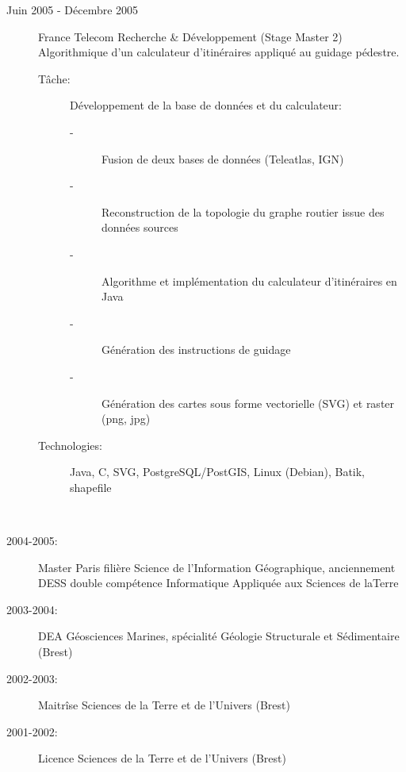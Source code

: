 \documentclass[11pt, oneside, a4paper, french]{article}
\begin{document}
\begin{description}
\item[Juin 2005 - D\'ecembre 2005] France Telecom Recherche \& D\'eveloppement (Stage Master 2)\\
 Algorithmique d'un calculateur d'itin\'eraires  appliqu\'e au guidage p\'edestre.
 \begin{description}
 \item[T\^ache:] D\'eveloppement de la base de donn\'ees et du calculateur:
   \begin{description}
   \item[-] Fusion de deux bases de donn\'ees (Teleatlas, IGN)
   \item[-] Reconstruction de la topologie du graphe routier issue des donn\'ees sources 
   \item[-] Algorithme et impl\'ementation du calculateur d'itin\'eraires en Java
   \item[-] G\'en\'eration des instructions de guidage
   \item[-] G\'en\'eration des cartes sous forme vectorielle (SVG) et raster (png, jpg)
   \end{description}
 \item[Technologies:] Java, C, SVG, PostgreSQL/PostGIS, Linux (Debian), Batik, shapefile
 \end{description}
\end{description}


\vspace{1cm}

\textbf{
  \Large{
  }
}\\
 \setcounter{vi}{6} %
\begin{description}
  \item[2004-2005:] Master Paris  fili\`ere Science de l'Information G\'eographique, anciennement DESS double comp\'etence Informatique Appliqu\'ee aux Sciences de laTerre
  \item[2003-2004:] DEA G\'eosciences Marines, sp\'ecialit\'e G\'eologie Structurale et S\'edimentaire (Brest)
  \item[2002-2003:] Maitr\^ise Sciences de la Terre et de l'Univers (Brest)
  \item[2001-2002:] Licence Sciences de la Terre et de l'Univers (Brest)
\end{description}

\vspace{1cm}
%
%

\textbf{
  \Large{
  }
}\\
\end{document}
